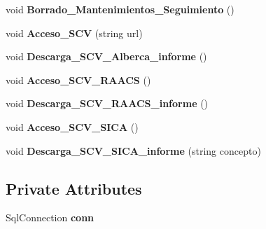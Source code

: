 \begin{DoxyCompactItemize}
\item 
void {\bfseries Borrado\+\_\+\+Mantenimientos\+\_\+\+Seguimiento} ()\hypertarget{class_sica_segura_1_1_s_i_c_a___log_aaf8e68471a47338df181bf30fed33f09}{}\label{class_sica_segura_1_1_s_i_c_a___log_aaf8e68471a47338df181bf30fed33f09}

\item 
void {\bfseries Acceso\+\_\+\+S\+CV} (string url)\hypertarget{class_sica_segura_1_1_s_i_c_a___log_ac6a73b8bb762030cdd5554fb19fdb09d}{}\label{class_sica_segura_1_1_s_i_c_a___log_ac6a73b8bb762030cdd5554fb19fdb09d}

\item 
void {\bfseries Descarga\+\_\+\+S\+C\+V\+\_\+\+Alberca\+\_\+informe} ()\hypertarget{class_sica_segura_1_1_s_i_c_a___log_acbab781b6fc7be744c75a3831e31ac38}{}\label{class_sica_segura_1_1_s_i_c_a___log_acbab781b6fc7be744c75a3831e31ac38}

\item 
void {\bfseries Acceso\+\_\+\+S\+C\+V\+\_\+\+R\+A\+A\+CS} ()\hypertarget{class_sica_segura_1_1_s_i_c_a___log_a6e0bdd6616b400331e0046b2d39c798f}{}\label{class_sica_segura_1_1_s_i_c_a___log_a6e0bdd6616b400331e0046b2d39c798f}

\item 
void {\bfseries Descarga\+\_\+\+S\+C\+V\+\_\+\+R\+A\+A\+C\+S\+\_\+informe} ()\hypertarget{class_sica_segura_1_1_s_i_c_a___log_a2c27d65ce8c5358a7a6e08b0c6e815d3}{}\label{class_sica_segura_1_1_s_i_c_a___log_a2c27d65ce8c5358a7a6e08b0c6e815d3}

\item 
void {\bfseries Acceso\+\_\+\+S\+C\+V\+\_\+\+S\+I\+CA} ()\hypertarget{class_sica_segura_1_1_s_i_c_a___log_a9e2342c5c1e9a0e8c25ea845bd7c4621}{}\label{class_sica_segura_1_1_s_i_c_a___log_a9e2342c5c1e9a0e8c25ea845bd7c4621}

\item 
void {\bfseries Descarga\+\_\+\+S\+C\+V\+\_\+\+S\+I\+C\+A\+\_\+informe} (string concepto)\hypertarget{class_sica_segura_1_1_s_i_c_a___log_acc474b43cdee0cc1ea2462aa100a551e}{}\label{class_sica_segura_1_1_s_i_c_a___log_acc474b43cdee0cc1ea2462aa100a551e}

\end{DoxyCompactItemize}
\subsection*{Private Attributes}
\begin{DoxyCompactItemize}
\item 
Sql\+Connection {\bfseries conn}\hypertarget{class_sica_segura_1_1_s_i_c_a___log_a53b3b913dbf6cbf7d5104ec1ba16d977}{}\label{class_sica_segura_1_1_s_i_c_a___log_a53b3b913dbf6cbf7d5104ec1ba16d977}

\end{DoxyCompactItemize}


